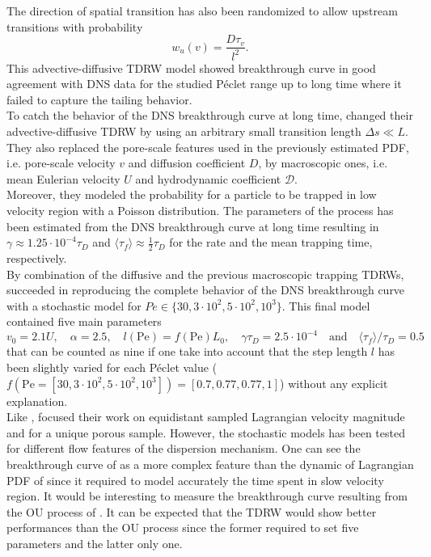 The direction of spatial transition has also been randomized to allow upstream transitions with probability 
\[w_u(v)=\frac{D\tau_v}{l^2}.\]
This advective-diffusive TDRW model showed breakthrough curve in good agreement with DNS data for the studied Péclet range up to long time where it failed to capture the tailing behavior. \\
To catch the behavior of the DNS breakthrough curve at long time, \citeauthor{Dentz2017} changed their advective-diffusive TDRW by using an arbitrary small transition length $\Delta s\ll L$. 
They also replaced the pore-scale features used in the previously estimated PDF, i.e. pore-scale velocity $v$ and diffusion coefficient $D$, by macroscopic ones, i.e. mean Eulerian velocity $U$ and hydrodynamic coefficient $\mathcal{D}$.\\
Moreover, they modeled the probability for a particle to be trapped in low velocity region with a Poisson distribution. 
The parameters of the process has been estimated from the DNS breakthrough curve at long time resulting in $\gamma\approx1.25\cdot10^{-4}\tau_D$ and $\langle\tau_f\rangle\approx\frac{1}{2}\tau_D$ for the rate and the mean trapping time, respectively.\\
By combination of the diffusive and the previous macroscopic trapping TDRWs, \citeauthor{Dentz2017} succeeded in reproducing the complete behavior of the DNS breakthrough curve with a stochastic model for $Pe\in\{30, 3\cdot10^2, 5\cdot10^2, 10^3\}$. This final model contained five main parameters  
\[v_0=2.1U,\quad\alpha=2.5,\quad l(\mathrm{Pe})=f(\mathrm{Pe})L_0,\quad\gamma\tau_D=2.5\cdot 10^{-4}\quad\textrm{and}\quad\langle\tau_f\rangle/\tau_D=0.5\]
that can be counted as nine if one take into account that the step length $l$ has been slightly varied for each Péclet value ($f(\mathrm{Pe}=[30, 3\cdot10^2, 5\cdot10^2, 10^3])=[0.7,0.77,0.77,1]$) without any explicit explanation.\\
Like \citeauthor{Puyguiraud2019}, \citeauthor{Dentz2017} focused their work on equidistant sampled Lagrangian velocity magnitude and for a unique porous sample. However, the stochastic models has been tested for different flow features of the dispersion mechanism. 
One can see the breakthrough curve of \citeauthor{Dentz2017} as a more complex feature than the dynamic of Lagrangian PDF of \citeauthor{Puyguiraud2019} since it required to model accurately the time spent in slow velocity region.
It would be interesting to measure the breakthrough curve resulting from the OU process of \citet{Puyguiraud2019}.
It can be expected that the TDRW would show better performances than the OU process since the former required to set five parameters and the latter only one.

